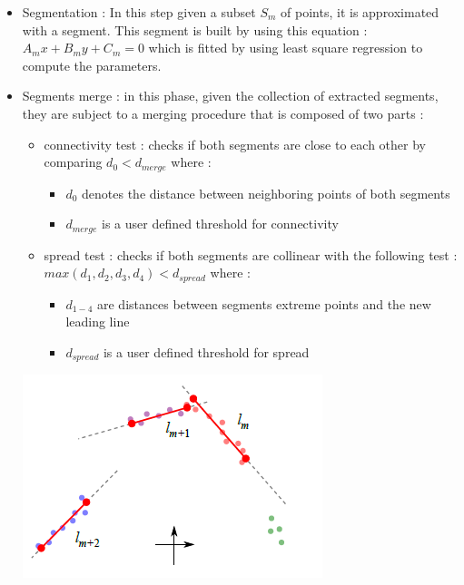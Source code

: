 \begin{itemize}
\begin{center}
\begin{figure}[H]
        \end{figure}            
    \end{center}    
    \item Segmentation : In this step given a subset \(S_{m}\) of points, it is approximated with a segment. This segment is built by using this equation : \(A_{m}x + B_{m}y + C_{m} = 0\) which is fitted by using least square regression to compute the parameters.
    \item Segments merge :  in this phase, given the collection of extracted segments, they are subject to a merging procedure that is composed of two parts : 
    \begin{itemize}
        \item connectivity test : checks if both segments are close to each other by comparing \(d_{0} < d_{merge}\) where :
        \begin{itemize}
            \item \(d_{0}\) denotes the distance between neighboring points of both segments
            \item \(d_{merge}\) is a user defined threshold for connectivity
        \end{itemize}
        \item spread test : checks if both segments are collinear with the following test : \(max (d_{1},d_{2},d_{3},d_{4})  < d_{spread}\) where :
        \begin{itemize}
            \item \(d_{1-4}\) are distances between segments extreme points and the new leading line
            \item \(d_{spread}\) is a user defined threshold for spread
        \end{itemize}
    \end{itemize}
    \begin{center}
        \includegraphics[scale=0.75]{images/detection/segment-points.png}    
    \end{center}  

\end{itemize}
